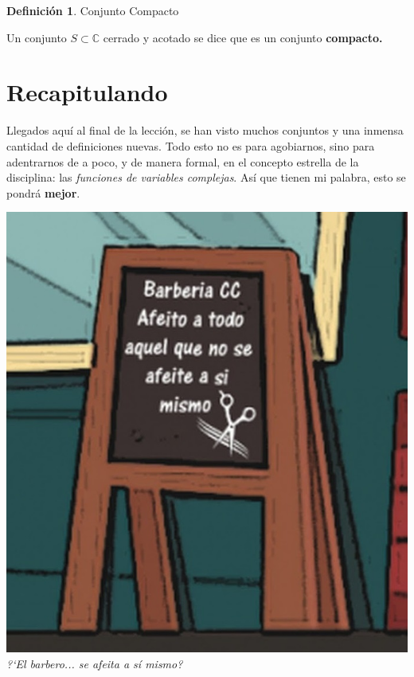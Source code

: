\documentclass[12pt]{article}
\theoremstyle{definition}
\newtheorem{definition}{Definici\'on}[section]
\begin{document}
\colorbox{green!40!white!80}{\parbox{\linewidth}{
\theoremstyle{definition}
\begin{definition} Conjunto Compacto

Un conjunto $S \subset \mathbb{C}$ cerrado y acotado se dice que es un conjunto \textbf{compacto.} 

\end{definition}}}
\linebreak
\linebreak

\section{Recapitulando}
Llegados aqu\'i al final de la lecci\'on, se han visto muchos conjuntos y una inmensa cantidad de definiciones nuevas. Todo esto no es para agobiarnos, sino para adentrarnos de a poco, y de manera formal, en el concepto estrella de la disciplina: las \textit{funciones de variables complejas}. As\'i que tienen mi palabra, esto se pondr\'a \textbf{mejor}.

\begin{center}
	\includegraphics[scale=0.6]{paradoja.jpg}\\
	\textit{?`El barbero... se afeita a s\'i mismo?}
\end{center}
\end{document}
